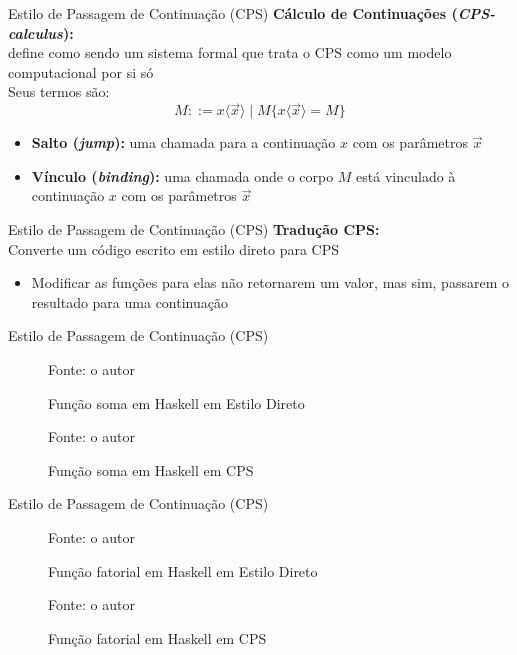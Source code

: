 \begin{frame}{Estilo de Passagem de Continuação (CPS)}
    \textbf{Cálculo de Continuações (\textit{CPS-calculus}):}\\
    \cite{thielecke1997} define como sendo um sistema formal que trata o CPS como um modelo computacional por si só\\
    Seus termos são:
    \begin{equation}
        M ::= x\langle \vec{x} \rangle \mid M\{x\langle \vec{x} \rangle = M\}\nonumber
    \end{equation}
    \begin{itemize}
        \item \textbf{Salto (\textit{jump}):} uma chamada para a continuação $x$ com os parâmetros $\vec{x}$
        \item \textbf{Vínculo (\textit{binding}):} uma chamada onde o corpo $M$ está vinculado à continuação $x$ com os parâmetros $\vec{x}$
    \end{itemize}
\end{frame}

\begin{frame}{Estilo de Passagem de Continuação (CPS)}
    \textbf{Tradução CPS:}\\
    Converte um código escrito em estilo direto para CPS~\cite{FLANAGAN1993}
    \begin{itemize}
        \item Modificar as funções para elas não retornarem um valor, mas sim, passarem o resultado para uma continuação
    \end{itemize}
\end{frame}

\begin{frame}{Estilo de Passagem de Continuação (CPS)}
    \begin{figure}
        \caption{Função soma em Haskell em Estilo Direto}
        
        \small{Fonte: o autor}
    \end{figure}

    \begin{figure}
        \caption{Função soma em Haskell em CPS}
        
        \small{Fonte: o autor}
    \end{figure}
\end{frame}

\begin{frame}{Estilo de Passagem de Continuação (CPS)}
    \begin{figure}
        \caption{Função fatorial em Haskell em Estilo Direto}
        
        \small{Fonte: o autor}
    \end{figure}

    \begin{figure}
        \caption{Função fatorial em Haskell em CPS}
        
        \small{Fonte: o autor}
    \end{figure}
\end{frame}

